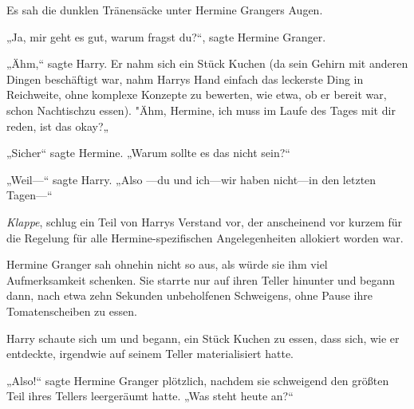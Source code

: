 Es sah die dunklen Tränensäcke unter Hermine Grangers Augen.

„Ja, mir geht es gut, warum fragst du?“, sagte Hermine Granger.

„Ähm,“ sagte Harry. Er nahm sich ein Stück Kuchen (da sein Gehirn mit anderen Dingen beschäftigt war, nahm Harrys Hand einfach das leckerste Ding in Reichweite, ohne komplexe Konzepte zu bewerten, wie etwa, ob er bereit war, schon Nachtischzu essen). "Ähm, Hermine, ich muss im Laufe des Tages mit dir reden, ist das okay?„

„Sicher“ sagte Hermine. „Warum sollte es das nicht sein?“

„Weil—“ sagte Harry. „Also —du und ich—wir haben nicht—in den letzten Tagen—“

\emph{Klappe}, schlug ein Teil von Harrys Verstand vor, der anscheinend vor kurzem für die Regelung für alle Hermine-spezifischen Angelegenheiten allokiert worden war.

Hermine Granger sah ohnehin nicht so aus, als würde sie ihm viel Aufmerksamkeit schenken. Sie starrte nur auf ihren Teller hinunter und begann dann, nach etwa zehn Sekunden unbeholfenen Schweigens, ohne Pause ihre Tomatenscheiben zu essen.

Harry schaute sich um und begann, ein Stück Kuchen zu essen, dass sich, wie er entdeckte, irgendwie auf seinem Teller materialisiert hatte.

„Also!“ sagte Hermine Granger plötzlich, nachdem sie schweigend den größten Teil ihres Tellers leergeräumt hatte. „Was steht heute an?“

